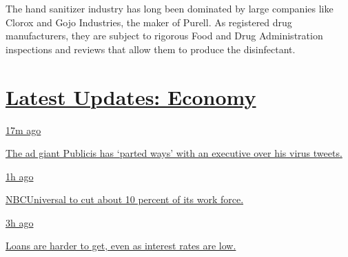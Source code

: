 The hand sanitizer industry has long been dominated by large companies
like Clorox and Gojo Industries, the maker of Purell. As registered drug
manufacturers, they are subject to rigorous Food and Drug Administration
inspections and reviews that allow them to produce the disinfectant.

\hypertarget{latest-updates-economy}{%
\section{\texorpdfstring{\href{https://www.nytimes.com/live/2020/08/04/business/stock-market-today-coronavirus?action=click\&pgtype=Article\&state=default\&region=MAIN_CONTENT_1\&context=storylines_live_updates}{Latest
Updates:
Economy}}{Latest Updates: Economy}}\label{latest-updates-economy}}

\href{https://www.nytimes.com/live/2020/08/04/business/stock-market-today-coronavirus?action=click\&pgtype=Article\&state=default\&region=MAIN_CONTENT_1\&context=storylines_live_updates\#the-ad-giant-publicis-has-parted-ways-with-an-executive-over-his-virus-tweets}{17m
ago}

\href{https://www.nytimes.com/live/2020/08/04/business/stock-market-today-coronavirus?action=click\&pgtype=Article\&state=default\&region=MAIN_CONTENT_1\&context=storylines_live_updates\#the-ad-giant-publicis-has-parted-ways-with-an-executive-over-his-virus-tweets}{The
ad giant Publicis has `parted ways' with an executive over his virus
tweets.}

\href{https://www.nytimes.com/live/2020/08/04/business/stock-market-today-coronavirus?action=click\&pgtype=Article\&state=default\&region=MAIN_CONTENT_1\&context=storylines_live_updates\#nbcuniversal-to-cut-about-10-percent-of-its-work-force}{1h
ago}

\href{https://www.nytimes.com/live/2020/08/04/business/stock-market-today-coronavirus?action=click\&pgtype=Article\&state=default\&region=MAIN_CONTENT_1\&context=storylines_live_updates\#nbcuniversal-to-cut-about-10-percent-of-its-work-force}{NBCUniversal
to cut about 10 percent of its work force.}

\href{https://www.nytimes.com/live/2020/08/04/business/stock-market-today-coronavirus?action=click\&pgtype=Article\&state=default\&region=MAIN_CONTENT_1\&context=storylines_live_updates\#loans-are-harder-to-get-even-as-interest-rates-are-low}{3h
ago}

\href{https://www.nytimes.com/live/2020/08/04/business/stock-market-today-coronavirus?action=click\&pgtype=Article\&state=default\&region=MAIN_CONTENT_1\&context=storylines_live_updates\#loans-are-harder-to-get-even-as-interest-rates-are-low}{Loans
are harder to get, even as interest rates are low.}

